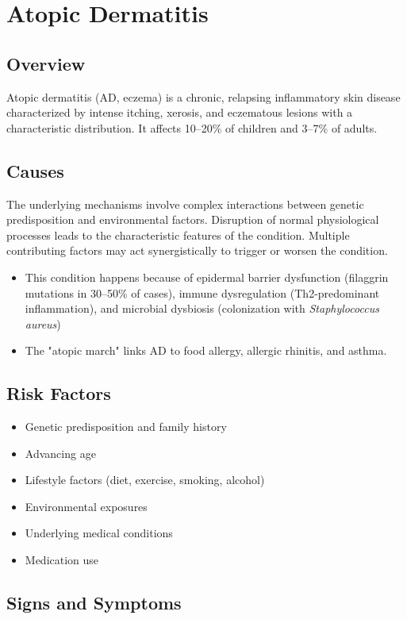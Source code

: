 \chapter{Atopic Dermatitis}
\label{sec:Atopic Dermatitis}

\section{Overview}
Atopic dermatitis (AD, eczema) is a chronic, relapsing inflammatory skin disease characterized by intense itching, xerosis, and eczematous lesions with a characteristic distribution. It affects 10--20\% of children and 3--7\% of adults.
\section{Causes}
The underlying mechanisms involve complex interactions between genetic predisposition and environmental factors. Disruption of normal physiological processes leads to the characteristic features of the condition. Multiple contributing factors may act synergistically to trigger or worsen the condition.

\begin{itemize}[noitemsep]
  \item This condition happens because of epidermal barrier dysfunction (filaggrin mutations in 30--50\% of cases), immune dysregulation (Th2-predominant inflammation), and microbial dysbiosis (colonization with \textit{Staphylococcus aureus})
  \item The "atopic march" links AD to food allergy, allergic rhinitis, and asthma.
\end{itemize}
\section{Risk Factors}


\begin{itemize}[noitemsep]
  \item Genetic predisposition and family history
  \item Advancing age
  \item Lifestyle factors (diet, exercise, smoking, alcohol)
  \item Environmental exposures
  \item Underlying medical conditions
  \item Medication use
\end{itemize}
\section{Signs and Symptoms}


